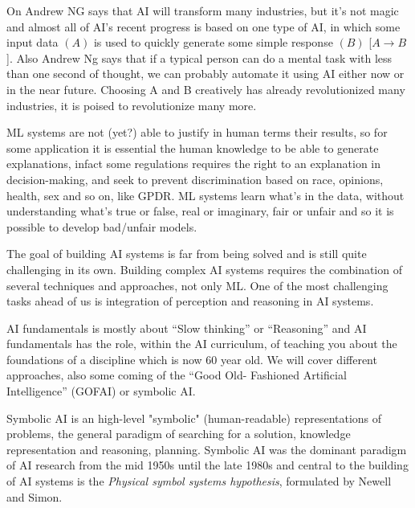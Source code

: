 On \cite{andrewNg} Andrew NG says that AI will transform many industries, but it’s not magic and 
almost all of AI’s recent progress is based on one type of AI, in which some input data $(A)$ is used to
quickly generate some simple response $(B)$ [$A \to B$].\newline
Also Andrew Ng says that if a typical person can do a mental task with less than one second of thought,
we can probably automate it using AI either now or in the near future.\newline
Choosing A and B creatively has already revolutionized many industries, it is poised to
revolutionize many more.

ML systems are not (yet?) able to justify in human terms their results, so for some application it is essential
the human knowledge to be able to generate explanations, infact some regulations requires the right
to an explanation in decision-making, and seek to prevent discrimination based on race, opinions,
health, sex and so on, like GPDR.\newline
ML systems learn what’s in the data, without understanding what's true or false, real or imaginary, 
fair or unfair and so it is possible to develop bad/unfair models.

The goal of building AI systems is far from being solved and is still quite challenging in its own.
Building complex AI systems requires the combination of several techniques and approaches, not only ML.\newline
One of the most challenging tasks ahead of us is integration of
perception and reasoning in AI systems.

AI fundamentals is mostly about “Slow thinking” or “Reasoning” and AI fundamentals has the role,
within the AI curriculum, of teaching you about the foundations of a discipline which is now 60 year old.\newline
We will cover different approaches, also some coming of the “Good Old-
Fashioned Artificial Intelligence” (GOFAI) or symbolic AI.

\begin{defi}
Symbolic AI is an high-level "symbolic" (human-readable) representations of problems, the 
general paradigm of searching for a solution, knowledge representation and reasoning, planning.\newline
Symbolic AI was the dominant paradigm of AI research from the mid 1950s until the late 1980s and 
central to the building of AI systems is the \emph{Physical symbol systems hypothesis}, formulated by Newell and Simon.
\end{defi}

